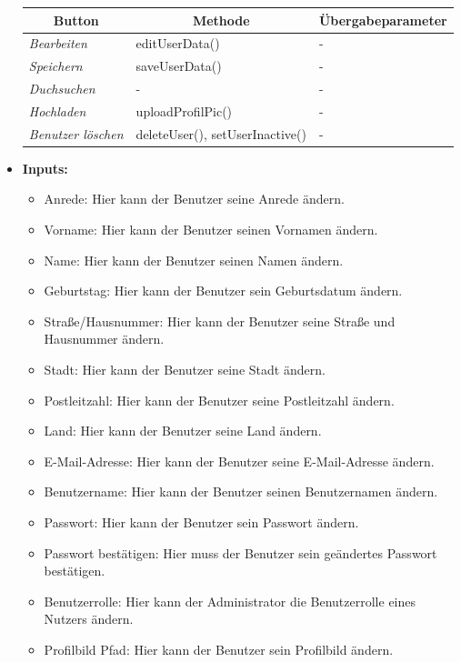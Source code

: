 \begin{itemize}
\begin{center}
\begin{longtable}{|p{4cm} |p{6cm} | p{4cm}|}
							\hline \multicolumn{1}{|c|}{\textbf{Button}} & \multicolumn{1}{|c|}{\textbf{Methode}} & \multicolumn{1}{|c|}{\textbf{\"{U}bergabeparameter}} \\ \hline
							\endfirsthead
							\hline
							\endlastfoot
							
							\textit{Bearbeiten } & editUserData() & - \\ \hline
							\textit{Speichern } & saveUserData() & - \\ \hline
							\textit{Duchsuchen } & - & - \\ \hline
							\textit{Hochladen } & uploadProfilPic() & - \\ \hline
							\textit{Benutzer löschen} &  deleteUser(), setUserInactive()  & - \\ \hline
						\end{longtable}
					\end{center}
				
			\item \textbf{Inputs:}
				\begin{itemize}
					\item Anrede: Hier kann der Benutzer seine Anrede ändern.
					\item Vorname: Hier kann der Benutzer seinen Vornamen ändern.
					\item Name: Hier kann der Benutzer seinen Namen ändern.
					\item Geburtstag: Hier kann der Benutzer sein Geburtsdatum ändern.
					\item Straße/Hausnummer: Hier kann der Benutzer seine Straße und Hausnummer ändern.
					\item Stadt: Hier kann der Benutzer seine Stadt ändern.
					\item Postleitzahl: Hier kann der Benutzer seine Postleitzahl ändern.
					\item Land: Hier kann der Benutzer seine Land ändern.
					\item E-Mail-Adresse: Hier kann der Benutzer seine E-Mail-Adresse ändern.
					\item Benutzername: Hier kann der Benutzer seinen Benutzernamen ändern.
					\item Passwort: Hier kann der Benutzer sein Passwort ändern.
					\item Passwort bestätigen: Hier muss der Benutzer sein geändertes Passwort bestätigen.
					\item Benutzerrolle: Hier kann der Administrator die Benutzerrolle eines Nutzers ändern.
					\item Profilbild Pfad: Hier kann der Benutzer sein Profilbild ändern.
				\end{itemize}
				

\end{itemize}
